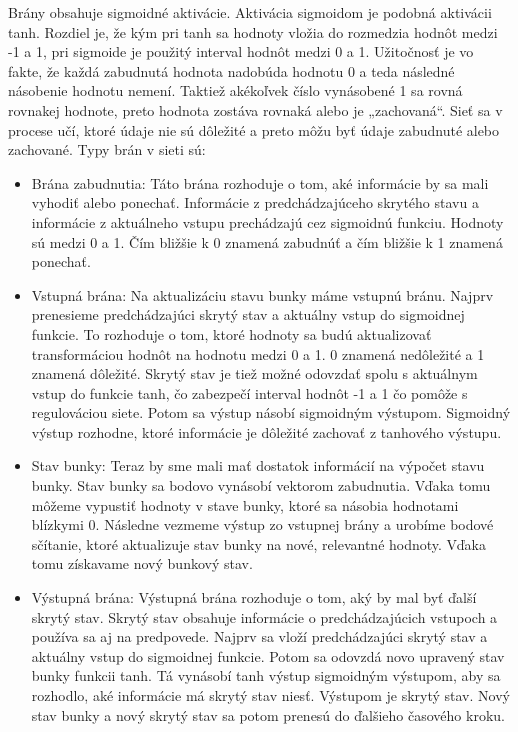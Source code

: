 Brány obsahuje sigmoidné aktivácie. Aktivácia sigmoidom je podobná aktivácii tanh. Rozdiel je, že kým pri tanh sa hodnoty vložia do rozmedzia hodnôt medzi -1 a 1, pri sigmoide je použitý interval hodnôt medzi 0 a 1. Užitočnosť je vo fakte, že každá zabudnutá hodnota nadobúda hodnotu 0 a teda následné násobenie hodnotu nemení. Taktiež akékoľvek číslo vynásobené 1 sa rovná rovnakej hodnote, preto hodnota zostáva rovnaká alebo je „zachovaná“. Sieť sa v procese učí, ktoré údaje nie sú dôležité a preto môžu byť údaje zabudnuté alebo zachované. Typy brán v sieti sú:
\begin{itemize}
    \item Brána zabudnutia: Táto brána rozhoduje o tom, aké informácie by sa mali vyhodiť alebo ponechať. Informácie z predchádzajúceho skrytého stavu a informácie z aktuálneho vstupu prechádzajú cez sigmoidnú funkciu. Hodnoty sú medzi 0 a 1. Čím bližšie k 0 znamená zabudnúť a čím bližšie k 1 znamená ponechať.
    \item Vstupná brána: Na aktualizáciu stavu bunky máme vstupnú bránu. Najprv prenesieme predchádzajúci skrytý stav a aktuálny vstup do sigmoidnej funkcie. To rozhoduje o tom, ktoré hodnoty sa budú aktualizovať transformáciou hodnôt na hodnotu medzi 0 a 1. 0 znamená nedôležité a 1 znamená dôležité. Skrytý stav je tiež možné odovzdať spolu s aktuálnym vstup do funkcie tanh, čo zabezpečí interval hodnôt -1 a 1 čo pomôže s regulováciou siete. Potom sa výstup násobí sigmoidným výstupom. Sigmoidný výstup rozhodne, ktoré informácie je dôležité zachovať z tanhového výstupu.
    \item Stav bunky: Teraz by sme mali mať dostatok informácií na výpočet stavu bunky. Stav bunky sa bodovo vynásobí vektorom zabudnutia. Vďaka tomu môžeme vypustiť hodnoty v stave bunky, ktoré sa násobia hodnotami blízkymi 0. Následne vezmeme výstup zo vstupnej brány a urobíme bodové sčítanie, ktoré aktualizuje stav bunky na nové, relevantné hodnoty. Vďaka tomu získavame nový bunkový stav.
    \item Výstupná brána: Výstupná brána rozhoduje o tom, aký by mal byť ďalší skrytý stav. Skrytý stav obsahuje informácie o predchádzajúcich vstupoch a používa sa aj na predpovede. Najprv sa vloží predchádzajúci skrytý stav a aktuálny vstup do sigmoidnej funkcie. Potom sa odovzdá novo upravený stav bunky funkcii tanh. Tá vynásobí tanh výstup sigmoidným výstupom, aby sa rozhodlo, aké informácie má skrytý stav niesť. Výstupom je skrytý stav. Nový stav bunky a nový skrytý stav sa potom prenesú do ďalšieho časového kroku.
\end{itemize}


